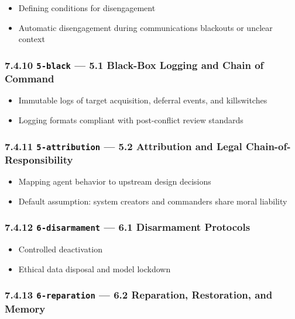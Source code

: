 \documentclass[11pt]{article}
\begin{document}
\begin{itemize}\setlength\itemsep{0pt}
\item Defining conditions for disengagement
\item Automatic disengagement during communications blackouts or unclear context
\end{itemize}


\subsubsection*{7.4.10 \texttt{5-black} — 5.1 Black-Box Logging and Chain of Command}


\begin{itemize}\setlength\itemsep{0pt}
\item Immutable logs of target acquisition, deferral events, and killswitches
\item Logging formats compliant with post-conflict review standards
\end{itemize}


\subsubsection*{7.4.11 \texttt{5-attribution} — 5.2 Attribution and Legal Chain-of-Responsibility}


\begin{itemize}\setlength\itemsep{0pt}
\item Mapping agent behavior to upstream design decisions
\item Default assumption: system creators and commanders share moral liability
\end{itemize}


\subsubsection*{7.4.12 \texttt{6-disarmament} — 6.1 Disarmament Protocols}


\begin{itemize}\setlength\itemsep{0pt}
\item Controlled deactivation
\item Ethical data disposal and model lockdown
\end{itemize}


\subsubsection*{7.4.13 \texttt{6-reparation} — 6.2 Reparation, Restoration, and Memory}
\end{document}
